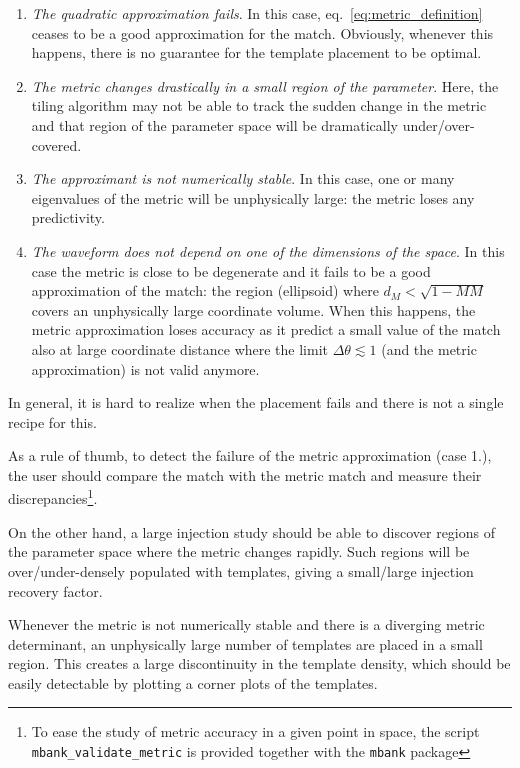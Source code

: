 \documentclass[twocolumn,showpacs,preprintnumbers,nofootinbib,prd,
superscriptaddress,10pt]{revtex4-2}
\newcommand{\mbank}{\texttt{mbank} }
\begin{document}
\begin{enumerate}
	\item {\it The quadratic approximation fails}. In this case, eq.~\eqref{eq:metric_definition} ceases to be a good approximation for the match. Obviously, whenever this happens, there is no guarantee for the template placement to be optimal.
	\item {\it The metric changes drastically in a small region of the parameter}. Here, the tiling algorithm may not be able to track the sudden change in the metric and that region of the parameter space will be dramatically under/over-covered.
	\item {\it The approximant is not numerically stable}. In this case, one or many eigenvalues of the metric will be unphysically large: the metric loses any predictivity.
	\item {\it The waveform does not depend on one of the dimensions of the space}. In this case the metric is close to be degenerate and it fails to be a good approximation of the match: the region (ellipsoid) where $d_M<\sqrt{1-MM}$ covers an unphysically large coordinate volume. When this happens, the metric approximation loses accuracy as it predict a small value of the match also at large coordinate distance where the limit $\Delta\theta \lesssim 1$ (and the metric approximation) is not valid anymore.
\end{enumerate}

In general, it is hard to realize when the placement fails and there is not a single recipe for this.

As a rule of thumb, to detect the failure of the metric approximation (case 1.), the user should compare the match with the metric match and measure their discrepancies\footnote{To ease the study of metric accuracy in a given point in space, the script \texttt{mbank\_validate\_metric} is provided together with the \mbank package}.

On the other hand, a large injection study should be able to discover regions of the parameter space where the metric changes rapidly. Such regions will be over/under-densely populated with templates, giving a small/large injection recovery factor.

Whenever the metric is not numerically stable and there is a diverging metric determinant, an unphysically large number of templates are placed in a small region. This creates a large discontinuity in the template density, which should be easily detectable by plotting a corner plots of the templates.
\end{document}
